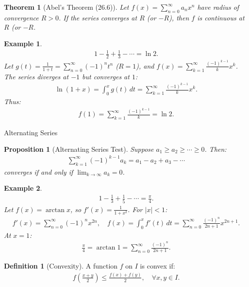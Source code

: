\documentclass[7pt]{article}
\theoremstyle{definition}
\newtheorem{definition}{Definition}
\theoremstyle{plain}
\newtheorem{theorem}{Theorem}
\newtheorem{proposition}{Proposition}
\newtheorem{example}{Example}
\begin{document}
\begin{theorem}[Abel’s Theorem (26.6)]
Let $ f(x) = \sum_{n=0}^\infty a_n x^n $ have radius of convergence $ R > 0 $. If the series converges at $ R $ (or $ -R $), then $ f $ is continuous at $ R $ (or $ -R $.
\end{theorem}

\begin{example}
\begin{align}
1 - \frac{1}{2} + \frac{1}{3} - \cdots = \ln 2.
\end{align}
Let $ g(t) = \frac{1}{1+t} = \sum_{n=0}^\infty (-1)^n t^n $ ($ R = 1 $), and $ f(x) = \sum_{k=1}^\infty \frac{(-1)^{k-1}}{k} x^k $. The series diverges at $ -1 $ but converges at $ 1 $:
\begin{align}
\ln(1+x) = \int_0^x g(t) \, dt = \sum_{k=1}^\infty \frac{(-1)^{k-1}}{k} x^k.
\end{align}
Thus:
\begin{align}
f(1) = \sum_{k=1}^\infty \frac{(-1)^{k-1}}{k} = \ln 2.
\end{align}
\end{example}

{Alternating Series}
\begin{proposition}[Alternating Series Test]
Suppose $ a_1 \geq a_2 \geq \cdots \geq 0 $. Then:
\begin{align}
\sum_{k=1}^\infty (-1)^{k-1} a_k = a_1 - a_2 + a_3 - \cdots
\end{align}
converges if and only if $ \lim_{k \to \infty} a_k = 0 $.
\end{proposition}

\begin{example}
\begin{align}
1 - \frac{1}{3} + \frac{1}{5} - \cdots = \frac{\pi}{4}.
\end{align}
Let $ f(x) = \arctan x $, so $ f'(x) = \frac{1}{1+x^2} $. For $ |x| < 1 $:
\begin{align}
f'(x) = \sum_{n=0}^\infty (-1)^n x^{2n}, \quad f(x) = \int_0^x f'(t) \, dt = \sum_{n=0}^\infty \frac{(-1)^n}{2n+1} x^{2n+1}.
\end{align}
At $ x = 1 $:
\begin{align}
\frac{\pi}{4} = \arctan 1 = \sum_{n=0}^\infty \frac{(-1)^n}{2n+1}.
\end{align}
\end{example}

\begin{definition}[Convexity]
A function $ f $ on $ I $ is convex if:
\begin{align}
f\left(\frac{x+y}{2}\right) \leq \frac{f(x) + f(y)}{2}, \quad \forall x, y \in I.
\end{align}
\end{definition}
\end{document}
